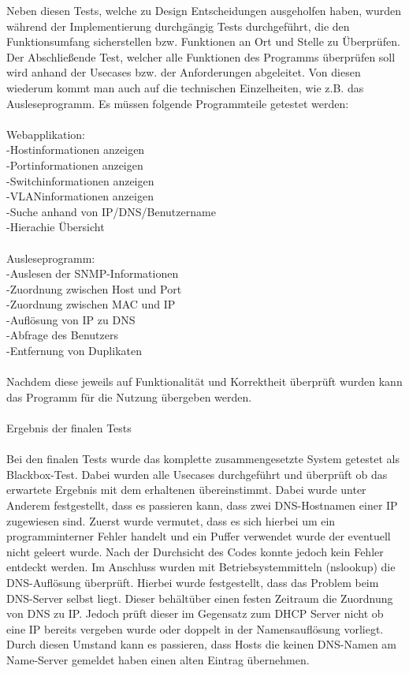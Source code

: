Neben diesen Tests, welche zu Design Entscheidungen ausgeholfen haben, wurden während der Implementierung durchgängig Tests durchgeführt, die den Funktionsumfang sicherstellen bzw. Funktionen an Ort und Stelle zu Überprüfen.\\
Der Abschließende Test, welcher alle Funktionen des Programms überprüfen soll wird anhand der Usecases bzw. der Anforderungen abgeleitet. Von diesen wiederum kommt man auch auf die technischen Einzelheiten, wie z.B. das Ausleseprogramm.
Es müssen folgende Programmteile getestet werden:\\
\\
Webapplikation:\\
-Hostinformationen anzeigen\\
-Portinformationen anzeigen\\
-Switchinformationen anzeigen\\
-VLANinformationen anzeigen\\
-Suche anhand von IP/DNS/Benutzername\\
-Hierachie Übersicht\\
\\
Ausleseprogramm:\\
-Auslesen der SNMP-Informationen\\
-Zuordnung zwischen Host und Port \\
-Zuordnung zwischen MAC und IP\\
-Auflösung von IP zu DNS\\
-Abfrage des Benutzers\\
-Entfernung von Duplikaten\\
\\
Nachdem diese jeweils auf Funktionalität und Korrektheit überprüft wurden kann das Programm für die Nutzung übergeben werden.\\
\\
Ergebnis der finalen Tests\\
\\
Bei den finalen Tests wurde das komplette zusammengesetzte System getestet als Blackbox-Test. Dabei wurden alle Usecases durchgeführt und überprüft ob das erwartete Ergebnis mit dem erhaltenen übereinstimmt. Dabei wurde unter Anderem festgestellt, dass es passieren kann, dass zwei DNS-Hostnamen einer IP zugewiesen sind. Zuerst wurde vermutet, dass es sich hierbei um ein programminterner Fehler handelt und ein Puffer verwendet wurde der eventuell nicht geleert wurde. Nach der Durchsicht des Codes konnte jedoch kein Fehler entdeckt werden. Im Anschluss wurden mit Betriebsystemmitteln (nslookup) die DNS-Auflösung überprüft. Hierbei wurde festgestellt, dass das Problem beim DNS-Server selbst liegt. Dieser behältüber einen festen Zeitraum die Zuordnung von DNS zu IP. Jedoch prüft dieser im Gegensatz zum DHCP Server nicht ob eine IP bereits vergeben wurde oder doppelt in der Namensauflösung vorliegt. Durch diesen Umstand kann es passieren, dass Hosts die keinen DNS-Namen am Name-Server gemeldet haben einen alten Eintrag übernehmen.


